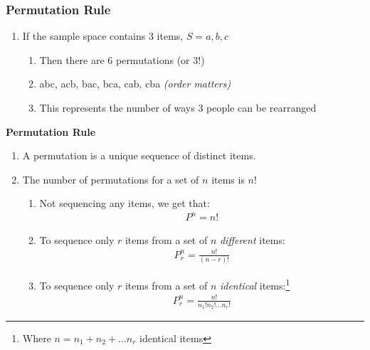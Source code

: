 \documentclass[../INDE315.tex]{subfiles}
\begin{document}
\subsubsection*{Permutation Rule}
\begin{enumerate}
    \item If the sample space contains 3 items, $S = {a, b, c}$ 
    \begin{enumerate}
        \item Then there are 6 permutations (or 3!)
        \item abc, acb, bac, bca, cab, cba \emph{(order matters)}
        \item This represents the number of ways 3 people can be rearranged
    \end{enumerate} 
\end{enumerate}
\begin{defn}
    \textbf{Permutation Rule}
    \begin{enumerate}
        \item A permutation is a unique sequence of distinct items. 
        \item The number of permutations for a set of $n$ items is $n!$
            \begin{enumerate}
                \item Not sequencing any items, we get that:
                    \begin{equation*}
                        \begin{aligned}
                            P^n = n!
                        \end{aligned}
                    \end{equation*}
                \item To sequence only $r$ items from a set of $n$ \emph{different} items:
                    \begin{equation*}
                        \begin{aligned}
                            P^n_r = \frac{n!}{(n-r)!}
                        \end{aligned}
                    \end{equation*}
                \item To sequence only $r$ items from a set of $n$ \emph{identical} items:\footnote{Where $n = n_1 + n_2 + \dots n_r$  identical items}
                    \begin{equation*}
                        \begin{aligned}
                            P^n_r = \frac{n!}{n_1! n_2! \dots n_r!}
                        \end{aligned}
                    \end{equation*}

            \end{enumerate}
    \end{enumerate}    
\end{defn}
\end{document}
